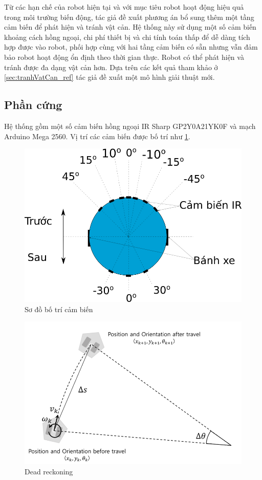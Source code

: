 Từ các hạn chế của robot hiện tại và với mục tiêu robot hoạt động hiệu quả trong môi trường biến động, tác giả đề xuất phương án bổ sung thêm một tầng cảm biến để phát hiện và tránh vật cản. Hệ thống này sử dụng một số cảm biến khoảng cách hồng ngoại, chi phí thiết bị và chi tính toán thấp để dễ dàng tích hợp được vào robot, phối hợp cùng với hai tầng cảm biến có sẵn nhưng vẫn đảm bảo robot hoạt động ổn định theo thời gian thực. Robot có thể phát hiện và tránh được đa dạng vật cản hơn. Dựa trên các kết quả tham khảo ở \ref{sec:tranhVatCan_ref} tác giả đề xuất một mô hình giải thuật mới.

\subsection{Phần cứng}


Hệ thống gồm một số cảm biến hồng ngoại IR Sharp GP2Y0A21YK0F và mạch Arduino Mega 2560. Vị trí các cảm biến được bố trí như \figurename{ \ref{fig:IR_layout}}.

\begin{figure}[htbp]
	\centering
	\includegraphics[width=0.7\linewidth]{figures/IR_layout.png}
	\caption{Sơ đồ bố trí cảm biến}
	\label{fig:IR_layout}
\end{figure}

\begin{figure}[htbp]
    \centering
    \includegraphics[width=0.7\linewidth]{figures/dead-reckoning.png}
    \caption{Dead reckoning \cite{pyo2017ros}}
    \label{fig:dead-reckoning}
\end{figure}

